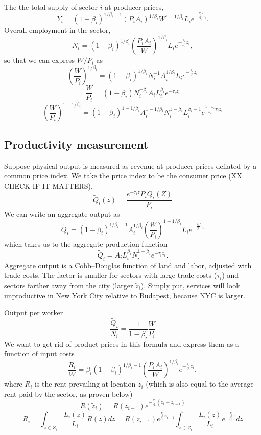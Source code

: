 \documentclass[12pt]{article}
\begin{document}
The the total supply of sector $i$ at producer prices,
\[
Y_i = (1-\beta_i)^{1/\beta_i-1}
(P_iA_i)^{1/\beta_i}W^{1-1/\beta_i} L_i e^{-\frac{\tau_i}{\beta_i} \tilde z_i}.
\]
Overall employment in the sector,
\[
N_i = (1-\beta_i)^{1/\beta_i}
\left(\frac{P_iA_i}{W}\right)^{1/\beta_i} L_i e^{-\frac{\tau_i}{\beta_i} \tilde z_i},
\]
so that we can express $W/P_i$ as
\[
\left(\frac{W}{P_i}\right)^{1/\beta_i} = (1-\beta_i)^{1/\beta_i}
N_i^{-1}A_i^{1/\beta_i}
L_i e^{-\frac{\tau_i}{\beta_i} \tilde z_i}
\]
\[
\frac{W}{P_i} = (1-\beta_i)
N_i^{-\beta_i}A_i L_i^{\beta_i}
 e^{-\tau_i\tilde z_i}
\]
\[
\left(\frac{W}{P_i}\right)^{1-1/\beta_i} = (1-\beta_i)^{1-1/\beta_i}
A_i^{1-1/\beta_i}N_i^{1-\beta_i}L_i^{\beta_i-1}
e^{\frac{1-\beta_i}{\beta_i}\tau_i \tilde z_i}
\]

\subsection{Productivity measurement}
Suppose physical output is measured as revenue at producer prices deflated by a common price index. We take the price index to be the consumer price (XX CHECK IF IT MATTERS).
\[
\tilde Q_i(z) = \frac{e^{-\tau_i z}P_iQ_i(Z)}{P_i}
\]
We can write an aggregate output as
\[
\tilde Q_i =
(1-\beta_i)^{1/\beta_i-1}
A_i^{1/\beta_i}\left(\frac{W}{P_i}\right)^{1-1/\beta_i}
L_i e^{-\frac{\tau_i}{\beta_i} \tilde z_i}
\]
which takes us to the aggregate production function
\[
\tilde Q_i =
A_iL_i^{\beta_i}N_i^{1-\beta_i}
 e^{-\tau_i\tilde z_i}.
\]
Aggregate output is a Cobb--Douglas function of land and labor, adjusted with trade costs. The factor is smaller for sectors with large trade costs ($\tau_i$) and sectors farther away from the city (larger $\tilde z_i$). Simply put, services will look unproductive in New York City relative to Budapest, because NYC is larger.

Output per worker
\[
\frac{\tilde Q_i}{N_i} = \frac1{1-\beta_i}
\frac{W}{P_i}
\]
We want to get rid of product prices in this formula and express them as a function of input costs
\[
\frac{R_i}{W} =\beta_i(1-\beta_i)^{1/\beta_i-1} \left(\frac{P_iA_i}{W}\right)^{1/\beta_i} e^{-\frac{\tau_i}{\beta_i} \tilde z_i},
\]
where $R_i$ is the rent prevailing at location $\tilde z_i$ (which is also equal to the average rent paid by the sector, as proven below)
\[
R(\tilde z_i) =
R(z_{i-1})e^{-\frac{\tau_i}{\beta_i}(\tilde z_i-z_{i-1})}
\]
\[
R_i =\int_{z\in Z_i}\frac{L_i(z)}{L_i}R(z)dz =
R(z_{i-1})e^{\frac{\tau_i}{\beta_i}z_{i-1}}
\int_{z\in Z_i}\frac{L_i(z)}{L_i}e^{-\frac{\tau_i}{\beta_i}z}dz
\]
\end{document}
